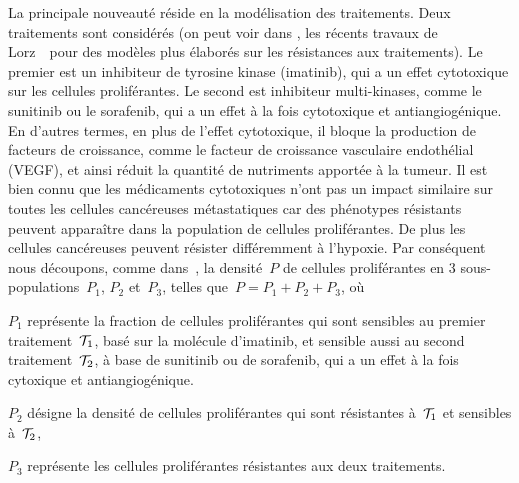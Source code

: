 \documentclass[main.tex]{subfiles}
\begin{document}
La principale nouveauté réside en la modélisation des traitements. Deux traitements sont considérés (on peut voir dans \cite{lorz2013}, les récents travaux de Lorz~\etal\ pour des modèles plus élaborés sur les résistances aux traitements). 
Le premier est un inhibiteur de tyrosine kinase (imatinib), %
qui a un effet cytotoxique 
sur les cellules proliférantes. Le second est inhibiteur multi-kinases, comme le sunitinib ou le sorafenib, qui a un effet à la fois cytotoxique et antiangiogénique. En d'autres termes, en plus de l'effet cytotoxique, il bloque la production de facteurs de croissance, comme le facteur de croissance vasculaire endothélial (VEGF), et ainsi réduit la quantité de nutriments apportée à la tumeur. 
Il est bien connu que les médicaments cytotoxiques n'ont pas un impact similaire sur toutes les cellules cancéreuses métastatiques car des phénotypes résistants peuvent apparaître dans la population de cellules proliférantes. De plus les cellules cancéreuses peuvent résister différemment à l'hypoxie. Par conséquent nous découpons, comme dans~\cite{Bresch2009}, la densité~$P$ de cellules proliférantes en 3 sous-populations~$P_1$, $P_2$ et~$P_3$, telles  que~$P=P_1+P_2+P_3$, où
\begin{myitemize}
\item $P_1$ représente la fraction de cellules proliférantes qui sont sensibles au premier traitement~${\mathcal T_1}$, basé sur la molécule d'imatinib, et sensible aussi au second traitement~${\mathcal T_2}$, à base de sunitinib ou de sorafenib, qui a un effet à la fois cytoxique et antiangiogénique. 
\item $P_2$ désigne la densité de cellules proliférantes qui sont résistantes à~${\mathcal T_1}$ et sensibles à~${\mathcal T_2}$,
\item $P_3$ représente les cellules proliférantes résistantes aux deux traitements. 
\end{myitemize}
\end{document}
